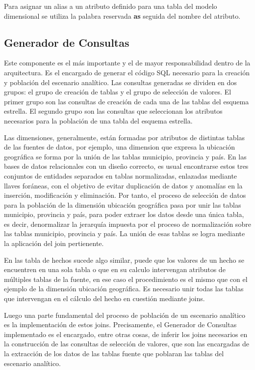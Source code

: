Para asignar un alias a un atributo definido para una tabla del modelo dimensional se utiliza la 
palabra reservada \textbf{as} seguida del nombre del atributo.


\subsection{Generador de Consultas}

Este componente es el m\'as importante y el de mayor responsabilidad dentro de la arquitectura. Es el encargado 
de generar el c\'odigo SQL necesario para la creaci\'on y población del escenario analítico. Las consultas generadas 
se dividen en dos grupos: el grupo de creaci\'on de tablas y el grupo de selecci\'on de valores. El primer grupo 
son las consultas de creaci\'on de cada una de las tablas del esquema estrella. El segundo grupo son las  consultas 
que seleccionan los atributos necesarios para la población de una tabla del esquema estrella. 

Las dimensiones, generalmente, est\'an formadas por atributos de distintas tablas de las fuentes de datos, por 
ejemplo, una dimension que expresa la ubicaci\'on geogr\'afica se forma por la uni\'on de las tablas municipio, 
provincia y pa\'is. En las bases de datos relacionales con un diseño correcto, es usual encontrarse estos 
tres conjuntos de entidades separados en tablas normalizadas, enlazadas mediante llaves for\'aneas, con el objetivo 
de evitar duplicaci\'on de datos y anomal\'ias en la inserci\'on, modificaci\'on y eliminaci\'on. Por tanto, el 
proceso de selecci\'on de datos para la población de la dimensi\'on ubicaci\'on geogr\'afica pasa por unir las 
tablas municipio, provincia y pa\'is, para poder extraer los datos desde una única tabla, es 
decir, denormalizar la jerarqu\'ia impuesta por el proceso de normalizaci\'on sobre las tablas municipio, provincia
y pa\'is. La uni\'on de esas tablas se logra mediante la aplicaci\'on del join pertienente.

En las tabla de hechos sucede algo similar, puede que los valores de un hecho se encuentren en una 
sola tabla o que en su calculo intervengan atributos de múltiples tablas de la fuente, en ese caso 
el procedimiento es el mismo que con el ejemplo de la dimensi\'on ubicaci\'on geogr\'afica. Es necesario 
unir todas las tablas que intervengan en el c\'alculo del hecho en cuesti\'on mediante joins.

Luego una parte fundamental del proceso de población de un escenario anal\'itico es la implementaci\'on 
de estos joins. Precisamente, el Generador de Consultas implementado es el encargado, entre otras cosas, de inferir los 
joins necesarios en la construcci\'on de las consultas de selecci\'on de valores, que son las encargadas de la 
extracci\'on de los datos de las tablas fuente que poblaran las tablas del escenario anal\'itico.

